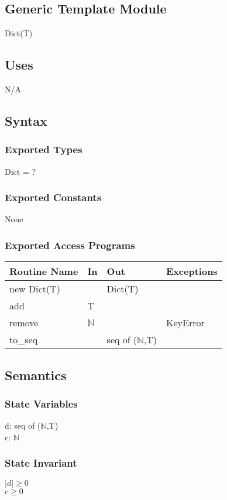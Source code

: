 \documentclass[12pt, titlepage]{article}
\begin{document}
\subsection*{Generic Template Module}
Dict(T)

\subsection*{Uses}
N/A

\subsection*{Syntax}
\subsubsection*{Exported Types}
Dict = ?

\subsubsection*{Exported Constants}
None

\subsubsection* {Exported Access Programs}
\begin{tabular}{|p{3cm}|p{3cm}|p{3cm}|p{4.5cm}|}
    \hline
    \textbf{Routine Name} & \textbf{In} & \textbf{Out} & \textbf{Exceptions} \\
    \hline
    new Dict(T) & & Dict(T) &\\
    \hline
    add & T & &\\
    \hline
    remove & $\mathbb{N}$ & & KeyError\\
    \hline
    to\_seq & & seq of ($\mathbb{N}$,T) & \\
    \hline
\end{tabular}

\subsection*{Semantics}
\subsubsection*{State Variables}
d: seq of ($\mathbb{N}$,T) \\
c: $\mathbb{N}$

\subsubsection*{State Invariant}
$|d| \geq 0$\\
$c \geq 0$
\end{document}
